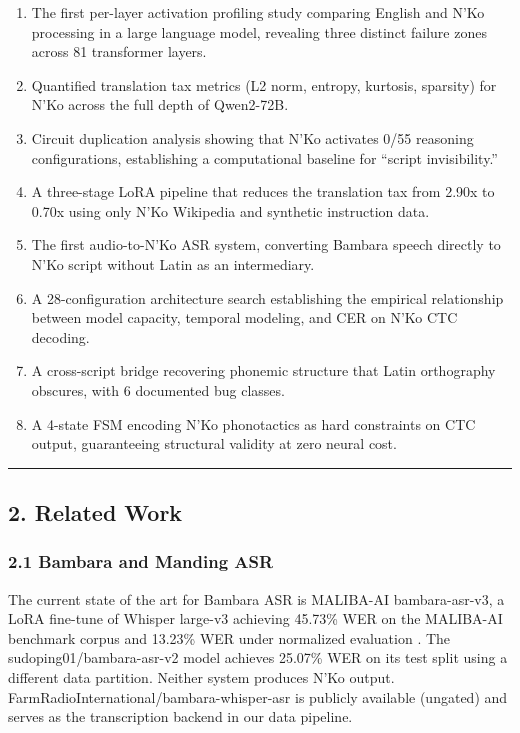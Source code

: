 \documentclass[
]{article}
\providecommand{\tightlist}{%
  \setlength{\itemsep}{0pt}\setlength{\parskip}{0pt}}
\begin{document}
\begin{enumerate}
\def\labelenumi{\arabic{enumi}.}
\tightlist
\item
  The first per-layer activation profiling study comparing English and
  N'Ko processing in a large language model, revealing three distinct
  failure zones across 81 transformer layers.
\item
  Quantified translation tax metrics (L2 norm, entropy, kurtosis,
  sparsity) for N'Ko across the full depth of Qwen2-72B.
\item
  Circuit duplication analysis showing that N'Ko activates 0/55
  reasoning configurations, establishing a computational baseline for
  ``script invisibility.''
\item
  A three-stage LoRA pipeline that reduces the translation tax from
  2.90x to 0.70x using only N'Ko Wikipedia and synthetic instruction
  data.
\item
  The first audio-to-N'Ko ASR system, converting Bambara speech directly
  to N'Ko script without Latin as an intermediary.
\item
  A 28-configuration architecture search establishing the empirical
  relationship between model capacity, temporal modeling, and CER on
  N'Ko CTC decoding.
\item
  A cross-script bridge recovering phonemic structure that Latin
  orthography obscures, with 6 documented bug classes.
\item
  A 4-state FSM encoding N'Ko phonotactics as hard constraints on CTC
  output, guaranteeing structural validity at zero neural cost.
\end{enumerate}

\begin{center}\rule{0.5\linewidth}{0.5pt}\end{center}

\subsection{2. Related Work}\label{related-work}

\subsubsection{2.1 Bambara and Manding
ASR}\label{bambara-and-manding-asr}

The current state of the art for Bambara ASR is MALIBA-AI
bambara-asr-v3, a LoRA fine-tune of Whisper large-v3 achieving 45.73\%
WER on the MALIBA-AI benchmark corpus and 13.23\% WER under normalized
evaluation \cite{maliba2024bambara}. The sudoping01/bambara-asr-v2 model
achieves 25.07\% WER on its test split using a different data partition.
Neither system produces N'Ko output.
FarmRadioInternational/bambara-whisper-asr is publicly available
(ungated) and serves as the transcription backend in our data pipeline.
\end{document}

